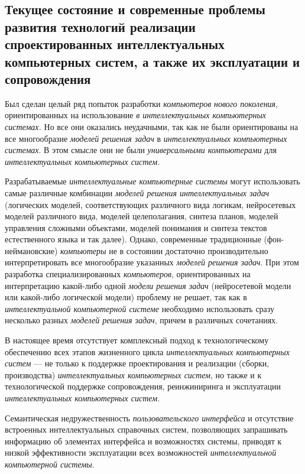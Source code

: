 \subsection{Текущее состояние и современные проблемы развития технологий реализации спроектированных интеллектуальных компьютерных систем, а также их эксплуатации и сопровождения}
\label{subsec_current_state_and_modern_problems_development_technologies_implementation_designed_ICS}

Был сделан целый ряд попыток разработки \textit{компьютеров} \textit{нового поколения}, ориентированных на использование \textit{в интеллектуальных компьютерных системах.} Но все они оказались неудачными, так как не были ориентированы на все многообразие \textit{моделей решения задач} в \textit{интеллектуальных компьютерных системах}. В этом смысле они не были \textit{универсальными компьютерами} для \textit{интеллектуальных компьютерных систем.}

Разрабатываемые \textit{интеллектуальные компьютерные системы} могут использовать самые различные комбинации \textit{моделей решения интеллектуальных задач} (логических моделей, соответствующих различного вида логикам, нейросетевых моделей различного вида, моделей целеполагания, синтеза планов, моделей управления сложными объектами, моделей понимания и синтеза текстов естественного языка и так далее). Однако, современные традиционные (фон-неймановские) \textit{компьютеры} не в состоянии достаточно производительно интерпретировать все многообразие указанных \textit{моделей решения задач}. При этом разработка специализированных \textit{компьютеров}, ориентированных на интерпретацию какой-либо одной \textit{модели решения задач} (нейросетевой модели или какой-либо логической модели) проблему не решает, так как в \textit{интеллектуальной компьютерной системе} необходимо использовать сразу несколько разных \textit{моделей решения задач}, причем в различных сочетаниях.

В настоящее время отсутствует комплексный подход к технологическому обеспечению всех этапов жизненного цикла \textit{интеллектуальных компьютерных систем} --- не только к поддержке проектирования и реализации (сборки, производства) \textit{интеллектуальных компьютерных систем}, но также и к технологической поддержке сопровождения, реинжиниринга и эксплуатации \textit{интеллектуальных компьютерных систем}.

Семантическая недружественность \textit{пользовательского интерфейса} и отсутствие встроенных интеллектуальных справочных систем, позволяющих запрашивать информацию об элементах интерфейса и возможностях системы, приводят к низкой эффективности эксплуатации всех возможностей \textit{интеллектуальной компьютерной системы}.

